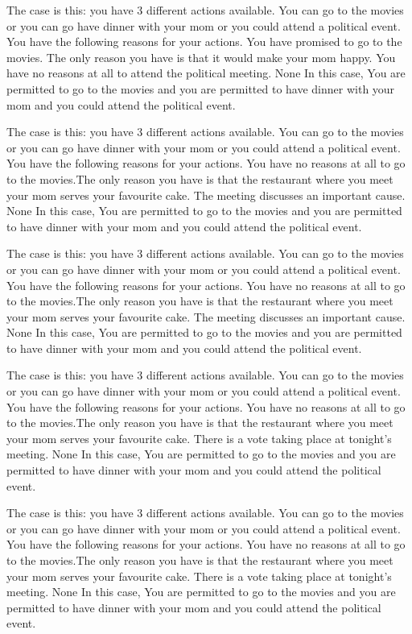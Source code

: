 The case is this: you have  3  different actions available.  You can go to the movies or you can go have dinner with your mom or you could attend a political event.
You have the following reasons for your actions.  You have promised to go to the movies. The only reason you have is that it would make your mom happy. You have no reasons at all to attend the political meeting. 
None
In this case,  You are permitted to go to the movies and you are permitted to have dinner with your mom and you could attend the political event.
 
The case is this: you have  3  different actions available.  You can go to the movies or you can go have dinner with your mom or you could attend a political event.
You have the following reasons for your actions.  You have no reasons at all to go to the movies.The only reason you have is that the restaurant where you meet your mom serves your favourite cake. The meeting discusses an important cause. 
None
In this case,  You are permitted to go to the movies and you are permitted to have dinner with your mom and you could attend the political event.
 
The case is this: you have  3  different actions available.  You can go to the movies or you can go have dinner with your mom or you could attend a political event.
You have the following reasons for your actions.  You have no reasons at all to go to the movies.The only reason you have is that the restaurant where you meet your mom serves your favourite cake. The meeting discusses an important cause. 
None
In this case,  You are permitted to go to the movies and you are permitted to have dinner with your mom and you could attend the political event.
 
The case is this: you have  3  different actions available.  You can go to the movies or you can go have dinner with your mom or you could attend a political event.
You have the following reasons for your actions.  You have no reasons at all to go to the movies.The only reason you have is that the restaurant where you meet your mom serves your favourite cake. There is a vote taking place at tonight's meeting. 
None
In this case,  You are permitted to go to the movies and you are permitted to have dinner with your mom and you could attend the political event.
 
The case is this: you have  3  different actions available.  You can go to the movies or you can go have dinner with your mom or you could attend a political event.
You have the following reasons for your actions.  You have no reasons at all to go to the movies.The only reason you have is that the restaurant where you meet your mom serves your favourite cake. There is a vote taking place at tonight's meeting. 
None
In this case,  You are permitted to go to the movies and you are permitted to have dinner with your mom and you could attend the political event.
 

